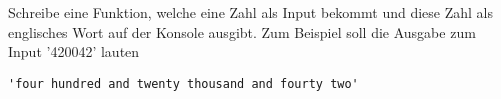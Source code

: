 \begin{aufg}
  Schreibe eine Funktion, welche eine Zahl als Input bekommt und 
  diese Zahl als englisches Wort auf der Konsole ausgibt.
  Zum Beispiel soll die Ausgabe zum Input '420042' lauten
  \begin{lstlisting}
'four hundred and twenty thousand and fourty two'
  \end{lstlisting}
\end{aufg}
